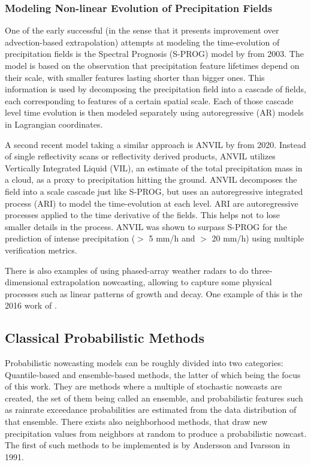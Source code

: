 \subsubsection*{Modeling Non-linear Evolution of Precipitation Fields}

One of the early successful (in the sense that it presents improvement over advection-based extrapolation) attempts at modeling the time-evolution of precipitation fields is the Spectral Prognosis (S-PROG) model by \citet{seed_dynamic_2003} from 2003. The model is based on the observation that precipitation feature lifetimes depend on their scale, with smaller features lasting shorter than bigger ones. This information is used by decomposing the precipitation field into a cascade of fields, each corresponding to features of a certain spatial scale. Each of those cascade level time evolution is then modeled separately using autoregressive (AR) models in Lagrangian coordinates. %

A second recent model taking a similar approach is ANVIL by \citet{pulkkinen_nowcasting_2020} from 2020. Instead of single reflectivity scans or reflectivity derived products, ANVIL utilizes Vertically Integrated Liquid (VIL), an estimate of the total precipitation mass in a cloud, as a proxy to precipitation hitting the ground. ANVIL decomposes the field into a scale cascade just like S-PROG, but uses an autoregressive integrated process (ARI) to model the time-evolution at each level. ARI are autoregressive processes applied to the time derivative of the fields. This helps not to lose smaller details in the process. ANVIL was shown to surpass S-PROG for the prediction of intense precipitation ($>$ 5 mm/h and $>$ 20 mm/h) using multiple verification metrics. 

There is also examples of using phased-array weather radars to do three-dimensional extrapolation nowcasting, allowing to capture some physical processes such as linear patterns of growth and decay. One example of this is the 2016 work of \citet{otsuka_precipitation_2016}. 


\subsection{Classical Probabilistic Methods}

Probabilistic nowcasting models can be roughly divided into two categories: Quantile-based and ensemble-based methods, the latter of which being the focus of this work. They are methods where a multiple of stochastic nowcasts are created, the set of them being called an ensemble, and probabilistic features such as rainrate exceedance probabilities are estimated from the data distribution of that ensemble.  
There exists also neighborhood methods, that draw new precipitation values from neighbors at random to produce a probabilistic nowcast. The first of such methods to be implemented is by Andersson and Ivarsson \citet{andersson_model_1991} in 1991. 


